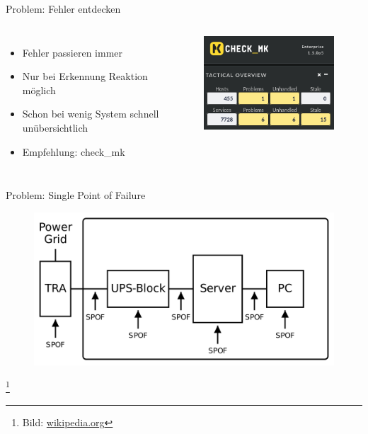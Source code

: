 \documentclass[10pt]{beamer}
\newcommand\blfootnote[1]{%
	\begingroup
	\renewcommand\thefootnote{}\footnote{#1}%
	\addtocounter{footnote}{-1}%
	\endgroup
}
\begin{document}
%
%
\begin{frame}[fragile]{Problem: Fehler entdecken}

\begin{columns}[T,c,onlytextwidth]
	\begin{itemize}
	\item Fehler passieren immer
	\item Nur bei Erkennung Reaktion möglich
	\item Schon bei wenig System schnell unübersichtlich
	\item Empfehlung: check\_mk
\end{itemize}
	\begin{figure}
		\includegraphics[width=1\textwidth]{images/omd}
	\end{figure}
\end{columns}
\end{frame}


%
%
\begin{frame}[fragile]{Problem: Single Point of Failure}
	\begin{figure}
	\includegraphics[width=1\textwidth]{images/spof1}
\end{figure}
\blfootnote{Bild: \href{https://de.wikipedia.org/wiki/Single_Point_of_Failure}{wikipedia.org}}
\end{frame}
\end{document}
